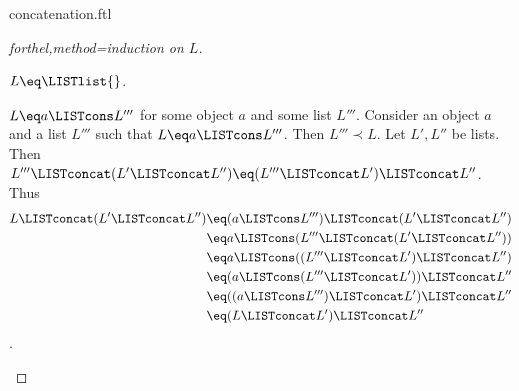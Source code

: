 \documentclass{naproche-library}
\begin{document}
\begin{smodule}[title=Concatenation]{concatenation.ftl}
\begin{proof}[forthel,method=induction on $L$]
  \begin{case}{$L \eq \LISTlist{}$.} \end{case}

  \begin{case}{$L \eq a \LISTcons L'''$ for some object $a$ and some list $L'''$.}
    Consider an object $a$ and a list $L'''$ such that $L \eq a \LISTcons L'''$.
    Then $L''' \prec L$.
    Let $L',L''$ be lists.
    Then $L''' \LISTconcat (L' \LISTconcat L'') \eq (L''' \LISTconcat L') \LISTconcat L''$.
    Thus
    \begin{align*}
      L \LISTconcat (L' \LISTconcat L'') 
        &\eq (a \LISTcons L''') \LISTconcat (L' \LISTconcat L'')\\
        &\eq a \LISTcons (L''' \LISTconcat (L' \LISTconcat L''))\\
        &\eq a \LISTcons ((L''' \LISTconcat L') \LISTconcat L'')\\
        &\eq (a \LISTcons (L''' \LISTconcat L')) \LISTconcat L''\\
        &\eq ((a \LISTcons L''') \LISTconcat L') \LISTconcat L''\\
        &\eq (L \LISTconcat L') \LISTconcat L''
    \end{align*}.
  \end{case}
\end{proof}
\end{smodule}
\end{document}
